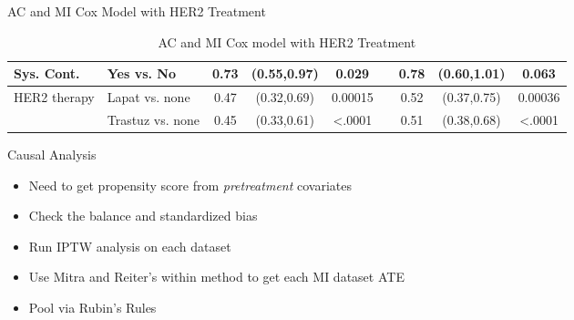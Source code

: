 \begin{frame}{AC and MI Cox Model with HER2 Treatment}
\begin{table}[]
{\begin{tabular}{|l|l|c|c|c|c|c|c|c|}
Sys. Cont.                     & Yes vs. No                       & 0.73                  & (0.55,0.97)                                        & 0.029                 &                       & 0.78 & (0.60,1.01)                                                          & 0.063                                                       \\ \hline
HER2 therapy                   & Lapat vs. none                   & 0.47                  & (0.32,0.69)                                        & 0.00015               &                       & 0.52 & (0.37,0.75)                                                          & 0.00036                                                     \\ \hline
                               & Trastuz vs. none                 & 0.45                  & (0.33,0.61)                                        & \textless.0001        &                       & 0.51 & (0.38,0.68)                                                          & \textless.0001                                              \\ \hline
\end{tabular}
}
\caption{AC and MI Cox model with HER2 Treatment}

\end{table}
\end{frame}

\begin{frame}{Causal Analysis}
\begin{itemize}
 \item Need to get propensity score from \textit{pretreatment} covariates
 \item Check the balance and standardized bias
 \item Run IPTW analysis on each dataset
 \item Use Mitra and Reiter's within method to get each MI dataset ATE \cite{Mitra2012}
 \item Pool via Rubin's Rules
\end{itemize}
\end{frame}
